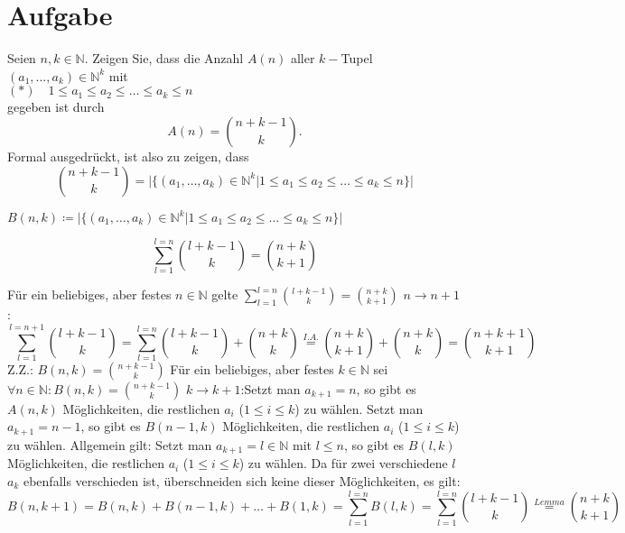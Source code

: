 \documentclass{article}
\begin{document}
\section{Aufgabe}
Seien $n, k\in \mathbb{N}$. Zeigen Sie, dass die Anzahl $A(n)$ aller $k-$Tupel $(a_1,\dots, a_k)\in \mathbb{N}^k$ mit\\
$(*)\quad 1\leq a_1\leq a_2\leq \dots \leq a_k\leq n$\\
gegeben ist durch
\[A(n) = \binom{n+k-1}{k}.\]
Formal ausgedrückt, ist also zu zeigen, dass
\[\binom{n+k-1}{k} = \Bigg|\Bigg\{(a_1,\dots, a_k)\in \mathbb{N}^k\Bigg|1\leq a_1\leq a_2\leq\dots\leq a_k\leq n\Bigg\}\Bigg|\]
\begin{definition}
	$B(n,k) \coloneqq \Bigg|\Bigg\{(a_1,\dots, a_k)\in \mathbb{N}^k\Bigg|1\leq a_1\leq a_2\leq\dots\leq a_k\leq n\Bigg\}\Bigg|$
\end{definition}
\begin{lemma}
	\[\sum_{l=1}^{l=n}\binom{l+k-1}{k} =\binom{n+k}{k+1} \]
\end{lemma}
{Für ein beliebiges, aber festes $n \in \mathbb{N}$ gelte $\sum_{l=1}^{l=n}\binom{l+k-1}{k} =\binom{n+k}{k+1}$}
{$n\to n+1$: $$\sum_{l=1}^{l=n+1}\binom{l+k-1}{k} = \sum_{l=1}^{l=n}\binom{l+k-1}{k} + \binom{n+k}{k} \overset{I.A.}{=}\binom{n+k}{k+1} +  \binom{n+k}{k} = \binom{n+k+1}{k+1}$$}
\noindent Z.Z.: $B(n,k) = \binom{n+k-1}{k}$
{Für ein beliebiges, aber festes $k\in \mathbb{N}$ sei $\forall n\in \mathbb{N}: B(n,k) = \binom{n+k-1}{k}$}
{$k\to k+1$:\quad Setzt man $a_{k+1} = n$, so gibt es $A(n,k)$ Möglichkeiten, die restlichen $a_i$ ($1\leq i\leq k$) zu wählen. Setzt man $a_{k+1} = n-1$, so gibt es $B(n-1,k)$ Möglichkeiten, die restlichen $a_i$ ($1\leq i\leq k$) zu wählen. Allgemein gilt: Setzt man $a_{k+1} = l\in \mathbb{N}$ mit $l\leq n$, so gibt es $B(l, k)$ Möglichkeiten, die restlichen $a_i$ ($1\leq i\leq k$) zu wählen. Da für zwei verschiedene $l$ $a_k$ ebenfalls verschieden ist, überschneiden sich keine dieser Möglichkeiten, es gilt:
\[B(n,k+1) = B(n,k) + B(n-1, k) + \dots + B(1,k) = \sum_{l=1}^{l=n}B(l, k) = \sum_{l=1}^{l=n}\binom{l+k-1}{k}\overset{Lemma}{=} \binom{n+k}{k+1}\]
}
\end{document}
